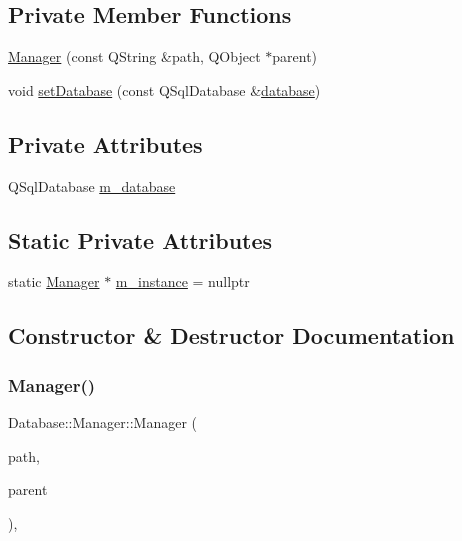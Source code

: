 \subsection*{Private Member Functions}
\begin{DoxyCompactItemize}
\item 
\mbox{\hyperlink{classDatabase_1_1Manager_a3046834f78e2c3c5bce479b8eba31df4}{Manager}} (const Q\+String \&path, Q\+Object $\ast$parent)
\item 
void \mbox{\hyperlink{classDatabase_1_1Manager_af7f86ed5807bd6299fe4aa594b72013c}{set\+Database}} (const Q\+Sql\+Database \&\mbox{\hyperlink{classDatabase_1_1Manager_aecc5a00737bf6392cccda37a99138d8c}{database}})
\end{DoxyCompactItemize}
\subsection*{Private Attributes}
\begin{DoxyCompactItemize}
\item 
Q\+Sql\+Database \mbox{\hyperlink{classDatabase_1_1Manager_a4de33edd790c0d8320c0a2a5990f5169}{m\+\_\+database}}
\end{DoxyCompactItemize}
\subsection*{Static Private Attributes}
\begin{DoxyCompactItemize}
\item 
static \mbox{\hyperlink{classDatabase_1_1Manager}{Manager}} $\ast$ \mbox{\hyperlink{classDatabase_1_1Manager_a35e8446687862c34ae818636f953f54e}{m\+\_\+instance}} = nullptr
\end{DoxyCompactItemize}


\subsection{Constructor \& Destructor Documentation}
\mbox{\label{classDatabase_1_1Manager_a3046834f78e2c3c5bce479b8eba31df4}} 
\subsubsection{\texorpdfstring{Manager()}{Manager()}}
{\footnotesize\ttfamily Database\+::\+Manager\+::\+Manager (\begin{DoxyParamCaption}\item[{const Q\+String \&}]{path,  }\item[{Q\+Object $\ast$}]{parent }\end{DoxyParamCaption})\hspace{0.3cm}{\ttfamily [explicit]}, {\ttfamily [private]}}



